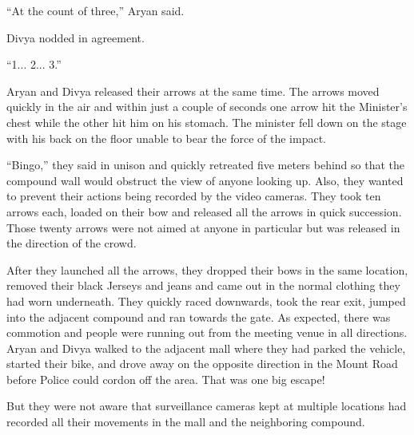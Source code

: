 “At the count of three,” Aryan said.

Divya nodded in agreement.

“1... 2... 3.”

Aryan and Divya released their arrows at the same time. The arrows moved quickly
in the air and within just a couple of seconds one arrow hit the Minister's
chest while the other hit him on his stomach. The minister fell down on the
stage with his back on the floor unable to bear the force of the impact.

“Bingo,” they said in unison and quickly retreated five meters behind so that
the compound wall would obstruct the view of anyone looking up. Also, they
wanted to prevent their actions being recorded by the video cameras. They took
ten arrows each, loaded on their bow and released all the arrows in quick
succession. Those twenty arrows were not aimed at anyone in particular but was
released in the direction of the crowd.

After they launched all the arrows, they dropped their bows in the same
location, removed their black Jerseys and jeans and came out in the normal
clothing they had worn underneath. They quickly raced downwards, took the rear
exit, jumped into the adjacent compound and ran towards the gate. As expected,
there was commotion and people were running out from the meeting venue in all
directions. Aryan and Divya walked to the adjacent mall where they had parked
the vehicle, started their bike, and drove away on the opposite direction in the
Mount Road before Police could cordon off the area. That was one big escape!

But they were not aware that surveillance cameras kept at multiple locations had
recorded all their movements in the mall and the neighboring compound.